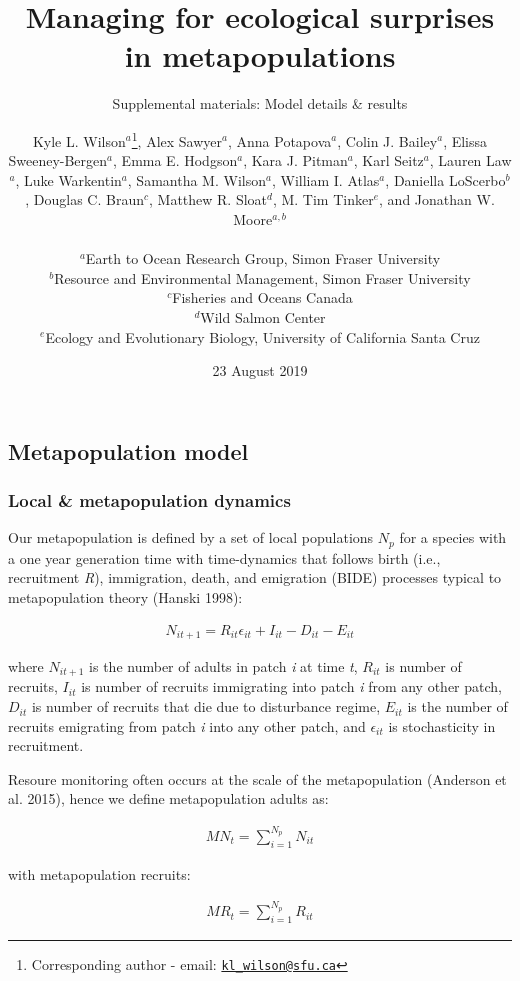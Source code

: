 \documentclass[]{article}
\title{Managing for ecological surprises in metapopulations}
\subtitle{Supplemental materials: Model details \& results}
\author{\textup{Kyle L. Wilson$^a$}\footnote{Corresponding author - email:
  \href{mailto:kl_wilson@sfu.ca}{\nolinkurl{kl\_wilson@sfu.ca}}}\textup{, Alex Sawyer$^a$, Anna Potapova$^a$, Colin J. Bailey$^a$, Elissa Sweeney-Bergen$^a$, Emma E. Hodgson$^a$, Kara J. Pitman$^a$, Karl Seitz$^a$, Lauren Law$^a$, Luke Warkentin$^a$, Samantha M. Wilson$^a$, William I. Atlas$^a$, Daniella LoScerbo$^b$, Douglas C. Braun$^c$, Matthew R. Sloat$^d$, M. Tim Tinker$^e$, and Jonathan W. Moore$^{a,b}$}\\
~\\
\textup{$^a$Earth to Ocean Research Group, Simon Fraser University}\\
\textup{$^b$Resource and Environmental Management, Simon Fraser University}\\
\textup{$^c$Fisheries and Oceans Canada}\\
\textup{$^d$Wild Salmon Center}\\
\textup{$^e$Ecology and Evolutionary Biology, University of California Santa Cruz}}
\date{23 August 2019}
\begin{document}
\maketitle

\centering
\raggedright
\tableofcontents
\newpage

\pagestyle{fancy}

\hypertarget{metapopulation-model}{%
\subsection{Metapopulation model}\label{metapopulation-model}}

\hypertarget{local-metapopulation-dynamics}{%
\subsubsection{Local \& metapopulation
dynamics}\label{local-metapopulation-dynamics}}

Our metapopulation is defined by a set of local populations \(N_p\) for
a species with a one year generation time with time-dynamics that
follows birth (i.e., recruitment \emph{R}), immigration, death, and
emigration (BIDE) processes typical to metapopulation theory (Hanski
1998):

\begin{align}
N_{i{t+1}}= R_{it}\epsilon_{it}+I_{it}-D_{it}-E_{it}
\end{align}

where \(N_{it+1}\) is the number of adults in patch \emph{i} at time
\emph{t}, \(R_{it}\) is number of recruits, \(I_{it}\) is number of
recruits immigrating into patch \emph{i} from any other patch,
\(D_{it}\) is number of recruits that die due to disturbance regime,
\(E_{it}\) is the number of recruits emigrating from patch \emph{i} into
any other patch, and \(\epsilon_{it}\) is stochasticity in recruitment.

Resoure monitoring often occurs at the scale of the metapopulation
(Anderson et al. 2015), hence we define metapopulation adults as:

\begin{align}
{MN}_t = \sum_{i=1}^{N_p} N_{it}
\end{align}

with metapopulation recruits:

\begin{align}
MR_t = \sum_{i=1}^{N_p} R_{it}
\end{align}
\end{document}
